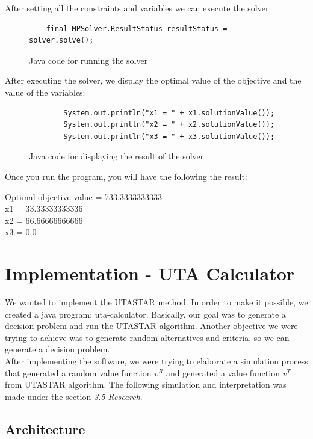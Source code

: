 \documentclass{report}
\begin{document}
After setting all the constraints and variables we can execute the solver: \\
\begin{figure}[H]
\centering
\begin{lstlisting}		
	final MPSolver.ResultStatus resultStatus = solver.solve();
\end{lstlisting}
\caption{Java code for running the solver}
\end{figure}
After executing the solver, we display the optimal value of the objective and the value of the variables: \\
\begin{figure}[H]
\centering
\begin{lstlisting}		
		System.out.println("x1 = " + x1.solutionValue());
		System.out.println("x2 = " + x2.solutionValue());
		System.out.println("x3 = " + x3.solutionValue());
\end{lstlisting}
\caption{Java code for displaying the result of the solver}
\end{figure}
Once you run the program, you will have the following the result: 
\begin{center}
Optimal objective value = 733.3333333333\\
x1 = 33.33333333336\\
x2 = 66.66666666666\\
x3 = 0.0\\
\end{center}
\newpage

\section{Implementation - UTA Calculator}
We wanted to implement the UTASTAR method. In order to make it possible, we created a java program: uta-calculator. Basically, our goal was to generate a decision problem and run the UTASTAR algorithm. Another objective we were trying to achieve was to generate random alternatives and criteria, so we can generate a decision problem. \\
After implementing the software, we were trying to elaborate a simulation process that generated a random value function $v^{R}$ and generated a value function $v^{T}$ from UTASTAR algorithm. The following simulation and interpretation was made under the section \textit{3.5 Research}.\\
\subsection{Architecture}
\end{document}
